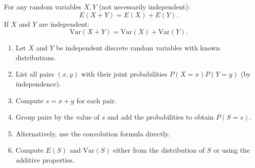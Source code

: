 \documentclass[11pt]{article}
\begin{document}
\begin{propriete}
For any random variables $X,Y$ (not necessarily independent):
\[
E(X+Y) = E(X) + E(Y).
\]
If $X$ and $Y$ are independent:
\[
\text{Var}(X+Y) = \text{Var}(X) + \text{Var}(Y).
\]
\end{propriete}

\begin{methode}
\begin{enumerate}
\item Let $X$ and $Y$ be independent discrete random variables with known distributions.
\item List all pairs $(x,y)$ with their joint probabilities $P(X=x)P(Y=y)$ (by independence).
\item Compute $s = x+y$ for each pair.
\item Group pairs by the value of $s$ and add the probabilities to obtain $P(S=s)$.
\item Alternatively, use the convolution formula directly.
\item Compute $E(S)$ and $\text{Var}(S)$ either from the distribution of $S$ or using the additive properties.
\end{enumerate}
\end{methode}
\end{document}
